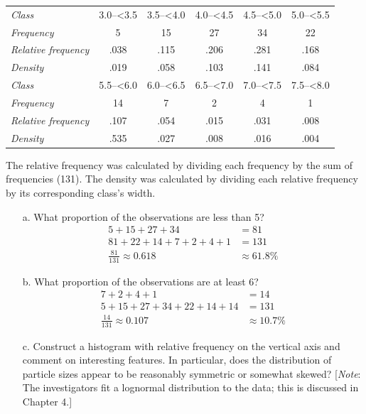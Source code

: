 \documentclass[letterpaper,12pt]{article}
\begin{document}
\begin{enumerate}
    \begin{center}
      \begin{tabular}{>{\itshape}l c c c c c}
        Class & 3.0--<3.5 & 3.5--<4.0 & 4.0--<4.5 & 4.5--<5.0 & 5.0--<5.5 \\
        Frequency & 5 & 15 & 27 & 34 & 22 \\
        Relative frequency & .038 & .115 & .206 & .281 & .168 \\
        Density & .019 & .058 & .103 & .141 & .084 \\
        \hline
        Class & 5.5--<6.0 & 6.0--<6.5 & 6.5--<7.0 &  7.0--<7.5 & 7.5--<8.0 \\
        Frequency & 14 & 7 & 2 & 4 & 1 \\
        Relative frequency & .107 & .054 & .015 & .031 & .008 \\
        Density & .535 & .027 & .008 & .016 & .004
      \end{tabular}
    \end{center}
    The relative frequency was calculated by dividing each frequency by the sum of frequencies (131). The density was calculated by dividing each relative frequency by its corresponding class's width.
    \begin{enumerate}
      \item[a.]
        What proportion of the observations are less than 5?
        \begin{align*}
          5 + 15 + 27 + 34 &= 81 \\
          81 + 22 + 14 + 7 + 2 + 4 + 1 &= 131 \\
          \frac{81}{131} \approx 0.618 &\approx 61.8\%
        \end{align*}
      \item[b.]
        What proportion of the observations are at least 6?
        \begin{align*}
          7 + 2 + 4 + 1 &= 14 \\
          5 + 15 + 27 + 34 + 22 + 14 + 14 &= 131 \\
          \frac{14}{131} \approx 0.107 &\approx 10.7\%
        \end{align*}
      \item[c.]
        Construct a histogram with relative frequency on the vertical axis and comment on interesting features. In particular, does the distribution of particle sizes appear to be reasonably symmetric or somewhat skewed? [\textit{Note}: The investigators fit a lognormal distribution to the data; this is discussed in Chapter 4.]

\end{enumerate}
\end{enumerate}
\end{document}
